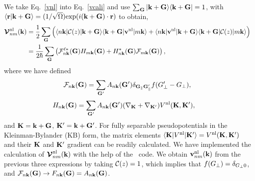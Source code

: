 \documentclass[floatfix,prb,aps,superscriptaddress,11pt,preprint,letterpaper]{revtex4}
\begin{document}
We take Eq.~\eqref{vnl} into Eq.~\eqref{vcali}
and use
$\sum_{\mathbf{G}}| \mathbf{k}+\mathbf{G} \rangle\langle \mathbf{k}+\mathbf{G} |=1$, 
with
$\langle {\mathbf{r}} | {\mathbf{k}+\mathbf{G}} \rangle=(1/\sqrt{\Omega})
\mathrm{exp}(i(\mathbf{k}+\mathbf{G})\cdot\mathbf{r})$
to obtain,
\begin{align}\label{vnl.5}
\boldsymbol{\mathcal{\cal V}}^{\mathrm{nl}}_{nm}(\mathbf{k})&=\frac{1}{2}
\sum_{\mathbf{G}}
\Big(
\langle n\mathbf{k} | {\mathbf{\cal C}}(z) 
| \mathbf{k}+\mathbf{G} \rangle\langle \mathbf{k}+\mathbf{G} |
\mathbf{v}^{\mathrm{nl}} | m\mathbf{k} \rangle
+
\langle n\mathbf{k} |
\mathbf{v}^{\mathrm{nl}}  
| \mathbf{k}+\mathbf{G} \rangle\langle \mathbf{k}+\mathbf{G} |
{\mathbf{\cal C}}(z) | m\mathbf{k} \rangle
\Big)
\nonumber\\
&=\frac{1}{2 \hbar}
\sum_{\mathbf{G}}
\left(
{\mathbf{\cal F}}^{\ell*}_{n\mathbf{k}}(\mathbf{G}) 
H_{m\mathbf{k}}(\mathbf{G}) 
+
H^*_{n\mathbf{k}}(\mathbf{G}) 
{\mathbf{\cal F}}_{m\mathbf{k}}(\mathbf{G}) 
\right) 
,
\end{align}  
where 
we have defined  
\begin{align}\label{vnl.10}
{\mathbf{\cal F}}_{n\mathbf{k}}(\mathbf{G}) 
=
\sum_{\mathbf{G}'} 
A_{n\mathbf{k}}(\mathbf{G}') 
\delta_{\mathbf{G}_\parallel \mathbf{G}'_\parallel}f(G'_\perp-G_\perp) 
,
\end{align} 
\begin{align}\label{vnl.11}
H_{n\mathbf{k}}(\mathbf{G})&=
\sum_{\mathbf{G}'} 
A_{n\mathbf{k}}(\mathbf{G}') 
(\nabla_{\mathbf{K}}+\nabla_{\mathbf{K}'})  
V^{\mathrm{nl}}(\mathbf{K},\mathbf{K}')
,
\end{align}
and $\mathbf{K}=\mathbf{k}+\mathbf{G}$, $\mathbf{K}'=\mathbf{k}+\mathbf{G}'$.
For fully  separable pseudopotentials in the   
Kleinman-Bylander (KB) form,\cite{mottaCMS10,kleinmanPRL82,adolphPRB96}  
the  
matrix elements 
 $\langle \mathbf{K} |  
V^{\mathrm{nl}}  
| \mathbf{K}' \rangle
=V^{\mathrm{nl}}(\mathbf{K},\mathbf{K}')  
$ 
and their $\mathbf{K}$ and $\mathbf{K}'$ gradient 
can be readily calculated.\cite{mottaCMS10,adolphPRB96,gordienkoRPJ04,fuchsCPC99} 
We have 
implemented 
the calculation of $\boldsymbol{\mathcal{\cal V}}^{\mathrm{nl}}_{nm}(\mathbf{k})$ with the help of 
the \depe~code.\cite{francesco}
We obtain $\mathbf{v}^{\mathrm{nl}}_{nm}(\mathbf{k})$ from the previous three 
expressions by taking ${\mathbf{\cal C}}(z)=1$, which implies 
that $f(G_\perp)=\delta_{G_\perp 0}$, 
and 
${\mathbf{\cal F}}_{n\mathbf{k}}(\mathbf{G}) \to F_{n\mathbf{k}}(\mathbf{G})=A_{n\mathbf{k}}(\mathbf{G})$.
\end{document}
